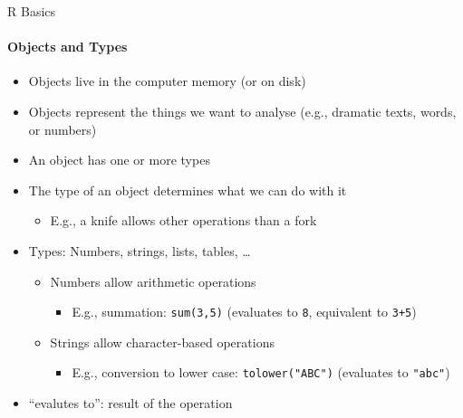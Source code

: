 \documentclass[ignorenonframetext,]{beamer}
\providecommand{\tightlist}{%
  \setlength{\itemsep}{0pt}\setlength{\parskip}{0pt}}
\begin{document}
\begin{frame}[fragile]{R Basics}
\protect\hypertarget{r-basics-1}{}

\framesubtitle{Objects and Types}

\begin{itemize}
\tightlist
\item
  Objects live in the computer memory (or on disk)
\item
  Objects represent the things we want to analyse (e.g., dramatic texts,
  words, or numbers)
\item
  An object has one or more types
\item
  The type of an object determines what we can do with it

  \begin{itemize}
  \tightlist
  \item
    E.g., a knife allows other operations than a fork \pause
  \end{itemize}
\item
  Types: Numbers, strings, lists, tables, \ldots{}

  \begin{itemize}
  \tightlist
  \item
    Numbers allow arithmetic operations

    \begin{itemize}
    \tightlist
    \item
      E.g., summation: \texttt{sum(3,5)} (evaluates to \texttt{8},
      equivalent to \texttt{3+5})
    \end{itemize}
  \item
    Strings allow character-based operations

    \begin{itemize}
    \tightlist
    \item
      E.g., conversion to lower case: \texttt{tolower("ABC")} (evaluates
      to \texttt{"abc"}) \pause
    \end{itemize}
  \end{itemize}
\item
  ``evalutes to'': result of the operation
\end{itemize}

\end{frame}
\end{document}
